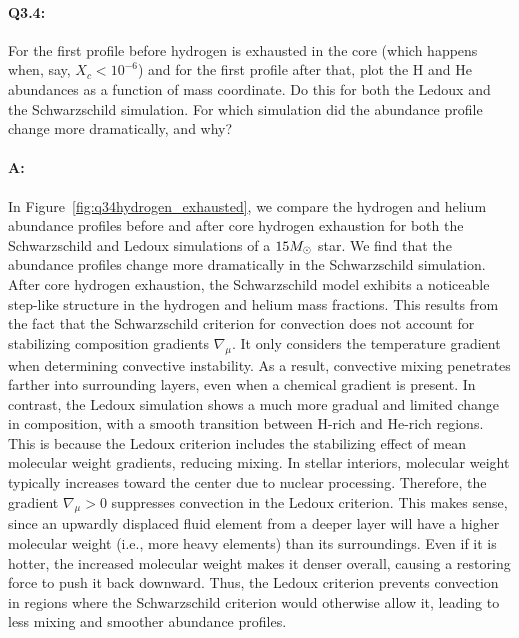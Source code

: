 \documentclass[twocolumn,fontsize=11pt]{scrartcl}
\begin{document}
\paragraph{Q3.4:} For the first profile before hydrogen is exhausted in the core (which happens when, say, \(X_c < 10^{-6}\)) and for the first profile after that, plot the H and He abundances as a function of mass coordinate. Do this for both the Ledoux and the Schwarzschild simulation. For which simulation did the abundance profile change more dramatically, and why?

\paragraph{A:} In Figure~\ref{fig:q34hydrogen_exhausted}, we compare the hydrogen and helium abundance profiles before and after core hydrogen exhaustion for both the Schwarzschild and Ledoux simulations of a $15M_\odot$ star. We find that the abundance profiles change more dramatically in the Schwarzschild simulation. After core hydrogen exhaustion, the Schwarzschild model exhibits a noticeable step-like structure in the hydrogen and helium mass fractions. This results from the fact that the Schwarzschild criterion for convection does not account for stabilizing composition gradients \(\nabla_\mu\). It only considers the temperature gradient when determining convective instability. As a result, convective mixing penetrates farther into surrounding layers, even when a chemical gradient is present. In contrast, the Ledoux simulation shows a much more gradual and limited change in composition, with a smooth transition between H-rich and He-rich regions. This is because the Ledoux criterion includes the stabilizing effect of mean molecular weight gradients, reducing mixing. In stellar interiors, molecular weight typically increases toward the center due to nuclear processing. Therefore, the gradient \(\nabla_\mu > 0\) suppresses convection in the Ledoux criterion. This makes sense, since an upwardly displaced fluid element from a deeper layer will have a higher molecular weight (i.e., more heavy elements) than its surroundings. Even if it is hotter, the increased molecular weight makes it denser overall, causing a restoring force to push it back downward. Thus, the Ledoux criterion prevents convection in regions where the Schwarzschild criterion would otherwise allow it, leading to less mixing and smoother abundance profiles.
\end{document}
